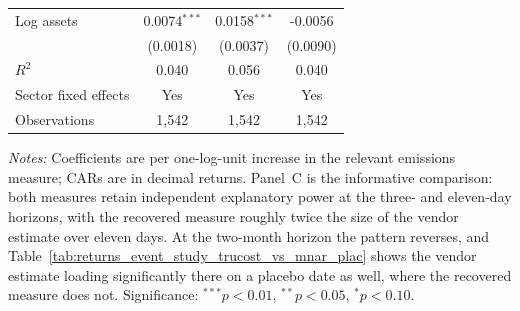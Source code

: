 \documentclass[a4paper,12pt]{article}
\begin{document}
\begin{table}[htbp]
\begin{tabular}{lccc}
Log assets & 0.0074$^{***}$ & 0.0158$^{***}$ & -0.0056 \\
 & (0.0018) & (0.0037) & (0.0090) \\
$R^2$ & 0.040 & 0.056 & 0.040 \\
\midrule
Sector fixed effects & Yes & Yes & Yes \\
Observations & 1,542 & 1,542 & 1,542 \\
\bottomrule
\end{tabular}
\begin{flushleft}\footnotesize
\textit{Notes:} Coefficients are per one-log-unit increase in the relevant
emissions measure; CARs are in decimal returns. Panel~C is the informative
comparison: both measures retain independent explanatory power at the three- and
eleven-day horizons, with the recovered measure roughly twice the size of the
vendor estimate over eleven days. At the two-month horizon the pattern reverses,
and Table~\ref{tab:returns_event_study_trucost_vs_mnar_plac} shows the vendor
estimate loading significantly there on a placebo date as well, where the recovered
measure does not. Significance: $^{***}p<0.01$, $^{**}p<0.05$, $^{*}p<0.10$.
\end{flushleft}
\end{table}
\end{document}
